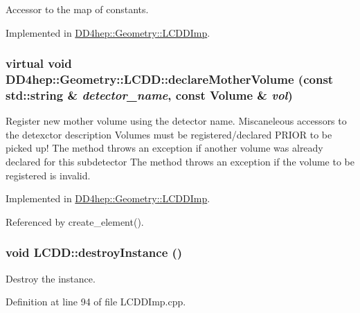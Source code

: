 Accessor to the map of constants. 

Implemented in \hyperlink{class_d_d4hep_1_1_geometry_1_1_l_c_d_d_imp_ad448fac04887abd5b7c6a0158e293c8c}{DD4hep::Geometry::LCDDImp}.\hypertarget{class_d_d4hep_1_1_geometry_1_1_l_c_d_d_a6cbadc0074dd9cc3b88b5e0a527586a2}{
\subsubsection[{declareMotherVolume}]{\setlength{\rightskip}{0pt plus 5cm}virtual void DD4hep::Geometry::LCDD::declareMotherVolume (const std::string \& {\em detector\_\-name}, \/  const {\bf Volume} \& {\em vol})}}
\label{class_d_d4hep_1_1_geometry_1_1_l_c_d_d_a6cbadc0074dd9cc3b88b5e0a527586a2}


Register new mother volume using the detector name. Miscaneleous accessors to the detexctor description Volumes must be registered/declared PRIOR to be picked up! The method throws an exception if another volume was already declared for this subdetector The method throws an exception if the volume to be registered is invalid. 

Implemented in \hyperlink{class_d_d4hep_1_1_geometry_1_1_l_c_d_d_imp_ac8faeaaa5f56b48c6306cb3099f84568}{DD4hep::Geometry::LCDDImp}.

Referenced by create\_\-element().\hypertarget{class_d_d4hep_1_1_geometry_1_1_l_c_d_d_a7470fc11102bacc2b486590de49a8017}{
\subsubsection[{destroyInstance}]{\setlength{\rightskip}{0pt plus 5cm}void LCDD::destroyInstance ()}}
\label{class_d_d4hep_1_1_geometry_1_1_l_c_d_d_a7470fc11102bacc2b486590de49a8017}


Destroy the instance. 

Definition at line 94 of file LCDDImp.cpp.


